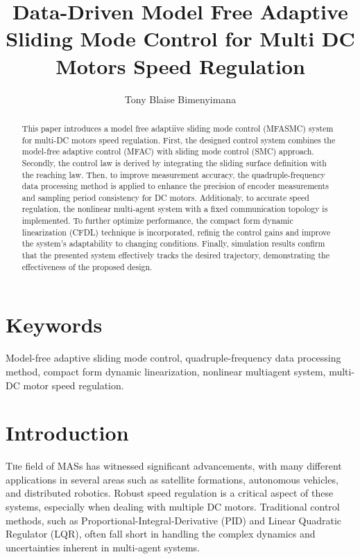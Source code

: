 \documentclass[journal,onecolumn]{IEEEtran}
\title{\LARGE Data-Driven Model Free Adaptive Sliding Mode Control for Multi DC Motors Speed Regulation}
\author{Tony Blaise Bimenyimana}
\begin{document}
\maketitle


\begin{abstract}
    This paper introduces a model free adaptiive sliding mode control (MFASMC) system for multi-DC motors speed regulation. First, the designed control system combines the model-free adaptive control (MFAC) with sliding mode control (SMC) approach. Secondly, the control law is derived by integrating the sliding surface definition with the reaching law. Then, to improve measurement accuracy, the quadruple-frequency data processing method is applied to enhance the precision of encoder measurements and sampling period consistency for DC motors. Additionaly, to accurate speed regulation, the nonlinear multi-agent system with a fixed communication topology is implemented. To further optimize performance, the compact form dynamic linearization (CFDL) technique is incorporated,  refinig the control gains and improve the system's adaptability to changing conditions. Finally, simulation results confirm that the presented system effectively tracks the desired trajectory, demonstrating the effectiveness of the proposed design.
\end{abstract}

\section*{Keywords}
Model-free adaptive sliding mode control, quadruple-frequency data processing method, compact form dynamic linearization, nonlinear multiagent system, multi-DC motor speed regulation.




\section{Introduction}\label{section:1}

\lettrine{T}he field of MASs has witnessed significant advancements, with many different applications in several areas such as satellite formations, autonomous vehicles, and distributed robotics. Robust speed regulation is a critical aspect of these systems, especially when dealing with multiple DC motors. Traditional control methods, such as Proportional-Integral-Derivative (PID) and Linear Quadratic Regulator (LQR), often fall short in handling the complex dynamics and uncertainties inherent in multi-agent systems.
\end{document}
